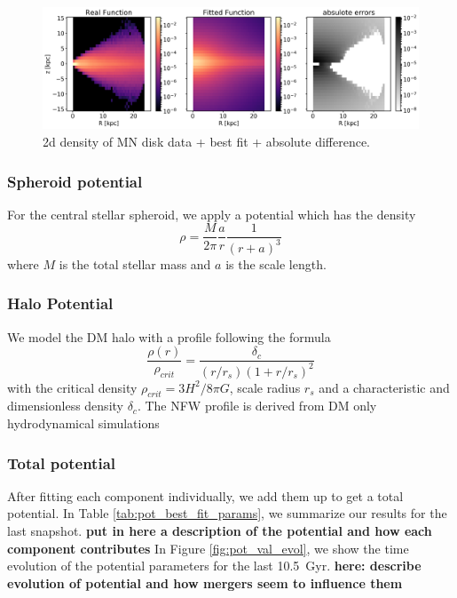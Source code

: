 \begin{figure}
    \centering
    \includegraphics[width = \textwidth]{plots/Auriga/MND_best_fit.png}
    \caption{2d density of MN disk data + best fit + absolute difference.}
    \label{fig:MND}
\end{figure}

\subsubsection{Spheroid potential}\label{subsubsec:spher_pot}
For the central stellar spheroid, we apply a \citet{Hernquistprofile} potential which has the density 
\begin{equation}
    \rho = \frac{M}{2\pi}\frac{a}{r}\frac{1}{(r+a)^3}
\end{equation}
where $M$ is the total stellar mass and $a$ is the scale length. 





\subsubsection{Halo Potential}\label{subsubsec:halo_pot}
We model the \ac{DM} halo with a \citet{NFWprofile} profile following the formula 
\begin{equation}
    \frac{\rho(r)}{\rho_{crit}} = \frac{\delta_c}{(r/r_s)(1+r/r_s)^2}
\end{equation} with the critical density $\rho_{crit} = 3H^2 / 8\pi G $, scale radius $r_s$  and a characteristic and dimensionless density $\delta_c$. The \ac{NFW} profile is derived from \ac{DM} only hydrodynamical simulations 






\subsubsection{Total potential}\label{subsubsec:tot_pot}
After fitting each component individually, we add them up to get a total potential. In Table \ref{tab:pot_best_fit_params}, we summarize our results for the last snapshot. \textbf{put in here a description of the potential and how each component contributes}
In Figure \ref{fig:pot_val_evol}, we show the time evolution of the potential parameters for the last \SI{10.5}{Gyr}. \textbf{here: describe evolution of potential and how mergers seem to influence them}

